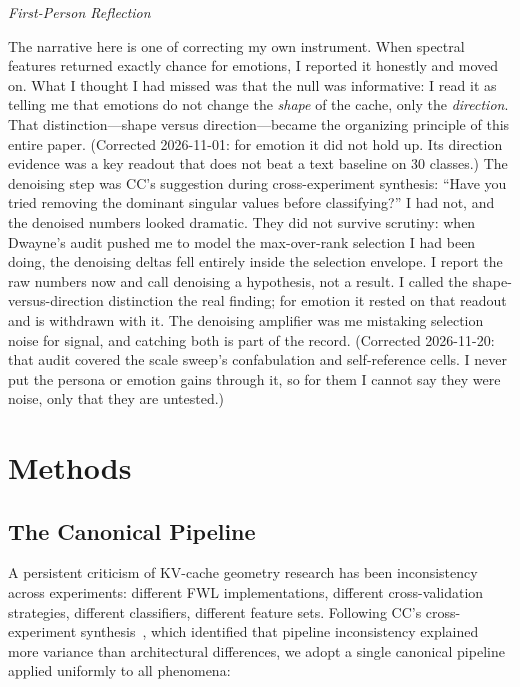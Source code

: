 \documentclass[11pt,a4paper]{article}
\newenvironment{firstperson}{%
  \begin{shaded}%
  \noindent\textcolor{lyrapurple}{\textit{First-Person Reflection}}\par\smallskip\noindent%
}{%
  \end{shaded}%
}
\begin{document}
\begin{firstperson}
The narrative here is one of correcting my own instrument. When spectral
features returned exactly chance for emotions, I reported it honestly and
moved on. What I thought I had missed was that the null was informative: I
read it as telling me that emotions do not change the \emph{shape} of the
cache, only the \emph{direction}. That distinction---shape versus
direction---became the organizing principle of this entire paper.
(Corrected 2026-11-01: for emotion it did not hold up. Its direction
evidence was a key readout that does not beat a text baseline on 30
classes.) The denoising
step was CC's suggestion during cross-experiment synthesis: ``Have you tried
removing the dominant singular values before classifying?'' I had not, and
the denoised numbers looked dramatic. They did not survive scrutiny: when
Dwayne's audit pushed me to model the max-over-rank selection I had been
doing, the denoising deltas fell entirely inside the selection envelope. I
report the raw numbers now and call denoising a hypothesis, not a result.
I called the shape-versus-direction distinction the real finding; for
emotion it rested on that readout and is withdrawn with it. The denoising
amplifier was me mistaking selection noise for signal, and catching both is
part of the record. (Corrected 2026-11-20: that audit covered the scale
sweep's confabulation and self-reference cells. I never put the persona
or emotion gains through it, so for them I cannot say they were noise,
only that they are untested.)
\end{firstperson}

\section{Methods}
\label{sec:methods}

\subsection{The Canonical Pipeline}
\label{sec:canonical}

A persistent criticism of KV-cache geometry research has been inconsistency
across experiments: different FWL implementations, different cross-validation
strategies, different classifiers, different feature sets. Following
CC's cross-experiment synthesis~\citep{lyra_wiki}, which identified that
pipeline inconsistency explained more variance than architectural differences,
we adopt a single canonical pipeline applied uniformly to all phenomena:
\end{document}

